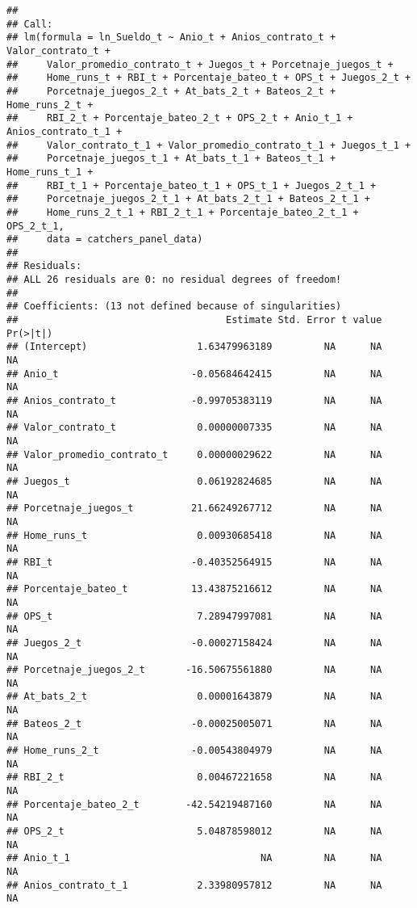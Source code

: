 \documentclass[
]{article}
\begin{document}
\begin{verbatim}
## 
## Call:
## lm(formula = ln_Sueldo_t ~ Anio_t + Anios_contrato_t + Valor_contrato_t + 
##     Valor_promedio_contrato_t + Juegos_t + Porcetnaje_juegos_t + 
##     Home_runs_t + RBI_t + Porcentaje_bateo_t + OPS_t + Juegos_2_t + 
##     Porcetnaje_juegos_2_t + At_bats_2_t + Bateos_2_t + Home_runs_2_t + 
##     RBI_2_t + Porcentaje_bateo_2_t + OPS_2_t + Anio_t_1 + Anios_contrato_t_1 + 
##     Valor_contrato_t_1 + Valor_promedio_contrato_t_1 + Juegos_t_1 + 
##     Porcetnaje_juegos_t_1 + At_bats_t_1 + Bateos_t_1 + Home_runs_t_1 + 
##     RBI_t_1 + Porcentaje_bateo_t_1 + OPS_t_1 + Juegos_2_t_1 + 
##     Porcetnaje_juegos_2_t_1 + At_bats_2_t_1 + Bateos_2_t_1 + 
##     Home_runs_2_t_1 + RBI_2_t_1 + Porcentaje_bateo_2_t_1 + OPS_2_t_1, 
##     data = catchers_panel_data)
## 
## Residuals:
## ALL 26 residuals are 0: no residual degrees of freedom!
## 
## Coefficients: (13 not defined because of singularities)
##                                    Estimate Std. Error t value Pr(>|t|)
## (Intercept)                   1.63479963189         NA      NA       NA
## Anio_t                       -0.05684642415         NA      NA       NA
## Anios_contrato_t             -0.99705383119         NA      NA       NA
## Valor_contrato_t              0.00000007335         NA      NA       NA
## Valor_promedio_contrato_t     0.00000029622         NA      NA       NA
## Juegos_t                      0.06192824685         NA      NA       NA
## Porcetnaje_juegos_t          21.66249267712         NA      NA       NA
## Home_runs_t                   0.00930685418         NA      NA       NA
## RBI_t                        -0.40352564915         NA      NA       NA
## Porcentaje_bateo_t           13.43875216612         NA      NA       NA
## OPS_t                         7.28947997081         NA      NA       NA
## Juegos_2_t                   -0.00027158424         NA      NA       NA
## Porcetnaje_juegos_2_t       -16.50675561880         NA      NA       NA
## At_bats_2_t                   0.00001643879         NA      NA       NA
## Bateos_2_t                   -0.00025005071         NA      NA       NA
## Home_runs_2_t                -0.00543804979         NA      NA       NA
## RBI_2_t                       0.00467221658         NA      NA       NA
## Porcentaje_bateo_2_t        -42.54219487160         NA      NA       NA
## OPS_2_t                       5.04878598012         NA      NA       NA
## Anio_t_1                                 NA         NA      NA       NA
## Anios_contrato_t_1            2.33980957812         NA      NA       NA

\end{verbatim}
\end{document}
